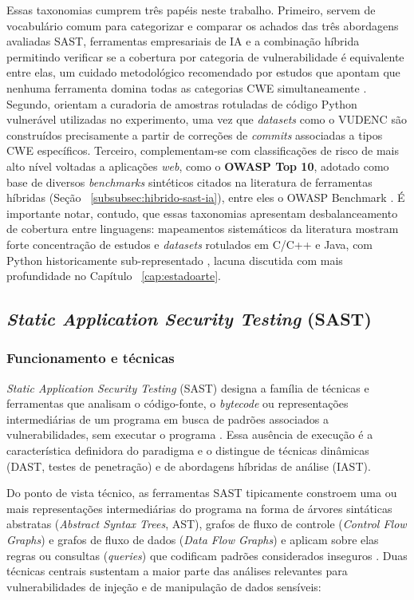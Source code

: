 Essas taxonomias cumprem três papéis neste trabalho. Primeiro, servem de vocabulário comum para categorizar e comparar os achados das três abordagens avaliadas SAST, ferramentas empresariais de IA e a combinação híbrida permitindo verificar se a cobertura por categoria de vulnerabilidade é equivalente entre elas, um cuidado metodológico recomendado por estudos que apontam que nenhuma ferramenta domina todas as categorias CWE simultaneamente \cite{Esposito2024SASTComparison, Zhu2024SASTAndroid}. Segundo, orientam a curadoria de amostras rotuladas de código Python vulnerável utilizadas no experimento, uma vez que \textit{datasets} como o VUDENC são construídos precisamente a partir de correções de \textit{commits} associadas a tipos CWE específicos. Terceiro, complementam-se com classificações de risco de mais alto nível voltadas a aplicações \textit{web}, como o \textbf{OWASP Top 10}, adotado como base de diversos \textit{benchmarks} sintéticos citados na literatura de ferramentas híbridas (Seção ~\ref{subsubsec:hibrido-sast-ia}), entre eles o OWASP Benchmark \cite{OWASP2021Top10}. É importante notar, contudo, que essas taxonomias apresentam desbalanceamento de cobertura entre linguagens: mapeamentos sistemáticos da literatura mostram forte concentração de estudos e \textit{datasets} rotulados em C/C++ e Java, com Python historicamente sub-representado \cite{Kalouptsoglou2023VulnPrediction, Germano2025LLMSLR}, lacuna discutida com mais profundidade no Capítulo ~\ref{cap:estadoarte}.


\subsection{\textit{Static Application Security Testing} (SAST)}\label{subsec:sast}
\subsubsection{Funcionamento e técnicas}\label{subsubsec:sast-funcionamento}
\textit{Static Application Security Testing} (SAST) designa a família de técnicas e ferramentas que analisam o código-fonte, o \textit{bytecode} ou representações intermediárias de um programa em busca de padrões associados a vulnerabilidades, sem executar o programa \cite{Dalaq2025SASTSLR}. Essa ausência de execução é a característica definidora do paradigma e o distingue de técnicas dinâmicas (DAST, testes de penetração) e de abordagens híbridas de análise (IAST).

Do ponto de vista técnico, as ferramentas SAST tipicamente constroem uma ou mais representações intermediárias do programa na forma de árvores sintáticas abstratas (\textit{Abstract Syntax Trees}, AST), grafos de fluxo de controle (\textit{Control Flow Graphs}) e grafos de fluxo de dados (\textit{Data Flow Graphs})  e aplicam sobre elas regras ou consultas (\textit{queries}) que codificam padrões considerados inseguros \cite{Li2024SASTCC, Dalaq2025SASTSLR}. Duas técnicas centrais sustentam a maior parte das análises relevantes para vulnerabilidades de injeção e de manipulação de dados sensíveis:


